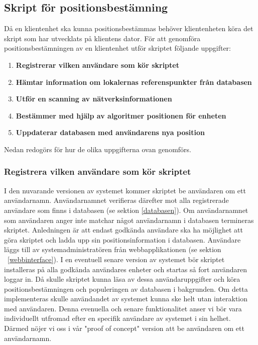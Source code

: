 \documentclass[swedish, a4paper,12pt]{article}
\begin{document}
\subsection{Skript för positionsbestämning}
Då en klientenhet ska kunna positionsbestämmas behöver klientenheten köra det skript som har utvecklats på klientens dator. För att genomföra positionsbestämningen av en klientenhet utför skriptet följande uppgifter:
\begin{enumerate}
  \item \textbf{Registrerar vilken användare som kör skriptet}
  \item \textbf{Hämtar information om lokalernas referenspunkter från databasen}
  \item \textbf{Utför en scanning av nätverksinformationen}
  \item \textbf{Bestämmer med hjälp av algoritmer positionen för enheten}
  \item \textbf{Uppdaterar databasen med användarens nya position}
\end{enumerate}

Nedan redogörs för hur de olika uppgifterna ovan genomförs. %

\subsubsection{Registrera vilken användare som kör skriptet}
I den nuvarande versionen av systemet kommer skriptet be användaren om ett användarnamn. Användarnamnet verifieras därefter mot alla registrerade användare som finns i databasen (se sektion \ref{databasen}). Om användarnamnet som användaren anger inte matchar något användarnamn i databasen termineras skriptet. Anledningen är att endast godkända användare ska ha möjlighet att göra skriptet och ladda upp sin positionsinformation i databasen. Användare läggs till av systemadministratören från webbapplikationen (se sektion ~\ref{webbinterface}). I en eventuell senare version av systemet bör skriptet installeras på alla godkända användares enheter och startas så fort användaren loggar in. Då skulle  skriptet kunna läsa av dessa användaruppgifter och köra positionsbestämningen och populeringen av databasen i bakgrunden. Om detta implementeras skulle användandet av systemet kunna ske helt utan interaktion med användaren. Denna evenuella och senare funktionalitet anser vi bör vara individuellt utfromad efter en specifik användare av systemet i sin helhet. Därmed nöjer vi oss i vår "proof of concept" version att be användaren om ett användarnamn. %
\end{document}
